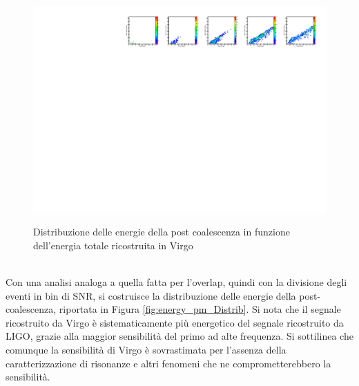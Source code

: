 \begin{figure}[hbt!]
	{\includegraphics[width=1.\textwidth]{figures/Capitolo_3/report/EnergyDistributionFactorDetector3APR4_q091.pdf}}\vspace{-8pt}
	\caption{Distribuzione delle energie della post coalescenza in funzione dell'energia totale ricostruita in Virgo}
	\label{fig:energy_pm_colz}
\end{figure}\\
Con una analisi analoga a quella fatta per l'overlap, quindi con la divisione degli eventi in bin di SNR, si costruisce la distribuzione delle energie della post-coalescenza, riportata in Figura \ref{fig:energy_pm_Distrib}. Si nota che il segnale ricostruito da Virgo è sistematicamente più energetico del segnale ricostruito da LIGO, grazie alla maggior sensibilità del primo ad alte frequenza. Si sottilinea che comunque la sensibilità di Virgo è sovrastimata per l'assenza della caratterizzazione di risonanze e altri fenomeni che ne comprometterebbero la sensibilità.
